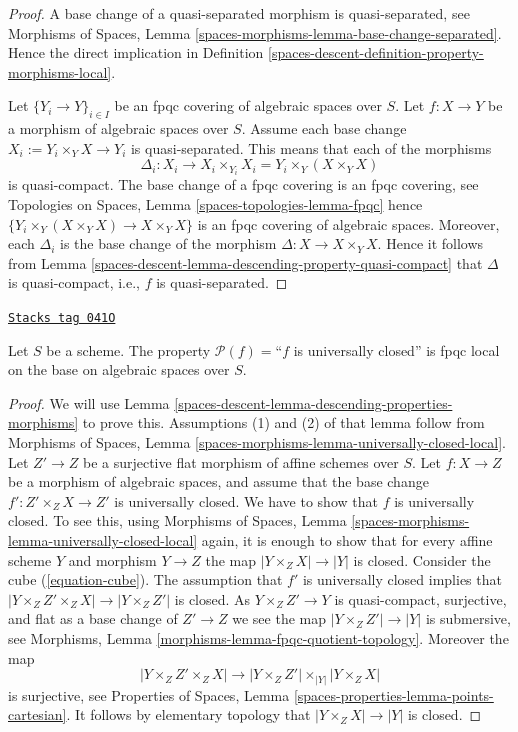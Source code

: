 \begin{proof}
A base change of a quasi-separated morphism is quasi-separated, see
Morphisms of Spaces,
Lemma \ref{spaces-morphisms-lemma-base-change-separated}.
Hence the direct implication in
Definition \ref{spaces-descent-definition-property-morphisms-local}.

\medskip\noindent
Let $\{Y_i \to Y\}_{i \in I}$ be an fpqc covering of algebraic spaces over $S$.
Let $f : X \to Y$ be a morphism of algebraic spaces over $S$.
Assume each base change $X_i := Y_i \times_Y X \to Y_i$ is quasi-separated.
This means that each of the morphisms
$$
\Delta_i :
X_i
\longrightarrow
X_i \times_{Y_i} X_i = Y_i \times_Y (X \times_Y X)
$$
is quasi-compact. The base change of a fpqc covering is an fpqc covering, see
Topologies on Spaces, Lemma \ref{spaces-topologies-lemma-fpqc}
hence $\{Y_i \times_Y (X \times_Y X) \to X \times_Y X\}$
is an fpqc covering of algebraic spaces. Moreover, each
$\Delta_i$ is the base change of the morphism
$\Delta : X \to X \times_Y X$. Hence it follows from
Lemma \ref{spaces-descent-lemma-descending-property-quasi-compact}
that $\Delta$ is quasi-compact, i.e., $f$ is quasi-separated.
\end{proof}

\begin{lemma}
\label{spaces-descent-lemma-descending-property-universally-closed}
\href{https://stacks.math.columbia.edu/tag/041O}{\texttt{Stacks tag 041O}}

Let $S$ be a scheme.
The property $\mathcal{P}(f) =$``$f$ is universally closed''
is fpqc local on the base on algebraic spaces over $S$.
\end{lemma}

\begin{proof}
We will use
Lemma \ref{spaces-descent-lemma-descending-properties-morphisms}
to prove this. Assumptions (1) and (2) of that lemma follow from
Morphisms of Spaces,
Lemma \ref{spaces-morphisms-lemma-universally-closed-local}.
Let $Z' \to Z$ be a surjective flat morphism of affine schemes over $S$.
Let $f : X \to Z$ be a morphism of algebraic spaces, and assume
that the base change $f' : Z' \times_Z X \to Z'$ is universally closed.
We have to show that $f$ is universally closed. To see this, using
Morphisms of Spaces,
Lemma \ref{spaces-morphisms-lemma-universally-closed-local}
again, it is enough to show that for every affine scheme $Y$ and
morphism $Y \to Z$ the map $|Y \times_Z X| \to |Y|$ is closed.
Consider the cube (\ref{equation-cube}).
The assumption that $f'$ is universally closed implies that
$|Y \times_Z Z' \times_Z X| \to |Y \times_Z Z'|$ is closed.
As $Y \times_Z Z' \to Y$ is quasi-compact, surjective, and flat
as a base change of $Z' \to Z$
we see the map $|Y \times_Z Z'| \to |Y|$ is submersive, see
Morphisms, Lemma \ref{morphisms-lemma-fpqc-quotient-topology}.
Moreover the map
$$
|Y \times_Z Z' \times_Z X|
\longrightarrow
|Y \times_Z Z'| \times_{|Y|} |Y \times_Z X|
$$
is surjective, see
Properties of Spaces, Lemma \ref{spaces-properties-lemma-points-cartesian}.
It follows by elementary topology that $|Y \times_Z X| \to |Y|$ is closed.
\end{proof}

